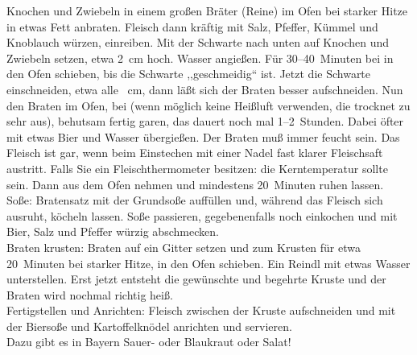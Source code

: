       \begin{zubereitung}
        Knochen und Zwiebeln in einem großen Bräter (Reine) im Ofen bei starker
        Hitze in etwas Fett anbraten. Fleisch dann kräftig mit Salz, Pfeffer,
        Kümmel und Knoblauch würzen, einreiben. Mit der Schwarte nach unten auf
        Knochen und Zwiebeln setzen, etwa 2~cm hoch. Wasser angießen. Für
        30--40~Minuten bei  in den Ofen schieben, bis die Schwarte
        ,,geschmeidig`` ist. Jetzt die Schwarte einschneiden, etwa alle
	\breh~cm, dann läßt sich der Braten besser aufschneiden. Nun den Braten
	im Ofen, bei  (wenn möglich keine Heißluft verwenden,
	die trocknet zu sehr aus), behutsam fertig garen, das dauert noch mal
        1\breh{}--2~Stunden. Dabei öfter mit etwas Bier und Wasser übergießen.
        Der Braten muß immer feucht sein. Das Fleisch ist gar, wenn beim
        Einstechen mit einer Nadel fast klarer Fleischsaft austritt. Falls Sie
        ein Fleischthermometer besitzen: die Kerntemperatur sollte 
        sein. Dann aus dem Ofen nehmen und mindestens 20~Minuten ruhen lassen.\\
        Soße: Bratensatz mit der Grundsoße auffüllen und, während das Fleisch
        sich ausruht, köcheln lassen. Soße passieren, gegebenenfalls noch
        einkochen und mit Bier, Salz und Pfeffer würzig abschmecken. \\
        Braten krusten: Braten auf ein Gitter setzen und zum Krusten für etwa
        20~Minuten bei starker Hitze,  in den Ofen schieben. Ein
        Reindl mit etwas Wasser unterstellen. Erst jetzt entsteht die gewünschte
        und begehrte Kruste und der Braten wird nochmal richtig heiß. \\
        Fertigstellen und Anrichten: Fleisch zwischen der Kruste aufschneiden
        und mit der Biersoße und Kartoffelknödel anrichten und servieren. \\
        Dazu gibt es in Bayern Sauer- oder Blaukraut oder Salat! \\
      \end{zubereitung}

      \begin{zutaten}
      \end{zutaten}

